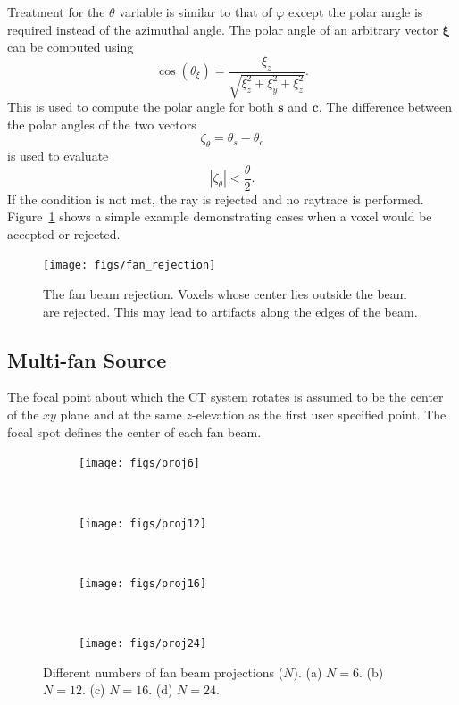 Treatment for the $\theta$ variable is similar to that of $\varphi$ except the polar angle is required instead of the azimuthal angle. The polar angle of an arbitrary vector $\boldsymbol{\xi}$ can be computed using \begin{equation}\label{eq:thetacos}
\cos(\theta_\xi) = \frac{\xi_z}{\sqrt{\xi_z^2 + \xi_y^2 + \xi_z^2}}.
\end{equation}
This is used to compute the polar angle for both $\boldsymbol{s}$ and $\boldsymbol{c}$. The difference between the polar angles of the two vectors 
\begin{equation}\label{eq:thetacos2}
\zeta_\theta = \theta_s - \theta_c
\end{equation}
is used to evaluate
\begin{equation}\label{eq:thetacoscon}
|\zeta_\theta| < \frac{\theta}{2}.
\end{equation}
If the condition is not met, the ray is rejected and no raytrace is performed. Figure~\ref{fig:fan_rejection} shows a simple example demonstrating cases when a voxel would be accepted or rejected.

\begin{figure}[tb]
  \begin{center}
   \texttt{[image: figs/fan\_rejection]}
  \end{center}
  \caption{The fan beam rejection. Voxels whose center lies outside the beam are rejected. This may lead to artifacts along the edges of the beam.}
\label{fig:fan_rejection}
\end{figure}

\subsection{Multi-fan Source}
The focal point about which the CT system rotates is assumed to be the center of the $xy$ plane and at the same $z$-elevation as the first user specified point. The focal spot defines the center of each fan beam.

\begin{figure}
    \centering
    \begin{subfigure}[b]{0.2\textwidth}
        \texttt{[image: figs/proj6]}
        \caption{}
        \label{fig:proj6}
    \end{subfigure}
    ~ 
    \begin{subfigure}[b]{0.2\textwidth}
        \texttt{[image: figs/proj12]}
        \caption{}
        \label{fig:proj12}
    \end{subfigure}
    ~ 
    \begin{subfigure}[b]{0.2\textwidth}
        \texttt{[image: figs/proj16]}
        \caption{}
        \label{fig:proj16}
    \end{subfigure}
    ~
    \begin{subfigure}[b]{0.2\textwidth}
        \texttt{[image: figs/proj24]}
        \caption{}
        \label{fig:proj24}
    \end{subfigure}
    \caption{Different numbers of fan beam projections ($N$). (a) $N = 6$. (b) $N = 12$. (c) $N = 16$. (d) $N = 24$.}\label{fig:fanproj}
\end{figure}

